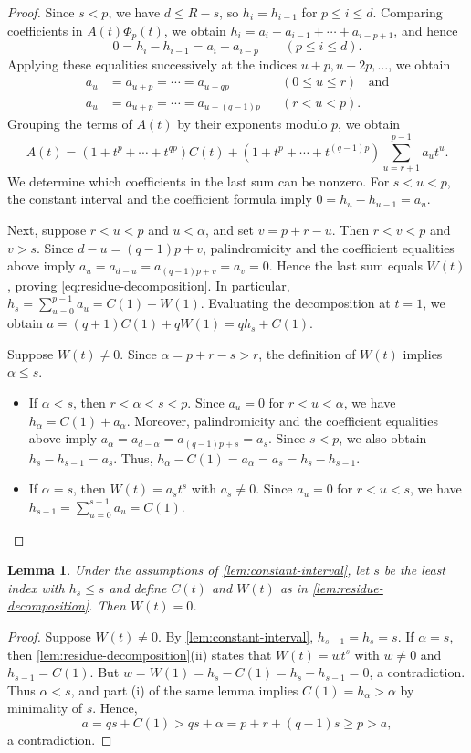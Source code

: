 \documentclass[11pt,a4paper]{amsart}
\newtheorem{lemma}[lemma]{Lemma}
\theoremstyle{definition}
\theoremstyle{remark}
\begin{document}
\begin{proof}
Since $s<p$, we have $d\le R-s$, so $h_i=h_{i-1}$ for $p\le i\le d$. Comparing coefficients in $A(t)\Phi_p(t)$, we obtain $h_i=a_i+a_{i-1}+\cdots+a_{i-p+1}$, and hence
\[0=h_i-h_{i-1}=a_i-a_{i-p}\qquad(p\le i\le d).\]
Applying these equalities successively at the indices $u+p,u+2p,\ldots$, we obtain
\begin{align*}
a_u&=a_{u+p}=\cdots=a_{u+qp}&&(0\le u\le r)\;\;\text{ and}\\
a_u&=a_{u+p}=\cdots=a_{u+(q-1)p}&&(r<u<p).
\end{align*}
Grouping the terms of $A(t)$ by their exponents modulo $p$, we obtain
\[A(t)=(1+t^p+\cdots+t^{qp})C(t)+(1+t^p+\cdots+t^{(q-1)p})\sum_{u=r+1}^{p-1}a_ut^u.\]
We determine which coefficients in the last sum can be nonzero. For $s<u<p$, the constant interval and the coefficient formula imply $0=h_u-h_{u-1}=a_u$.

Next, suppose $r<u<p$ and $u<\alpha$, and set $v=p+r-u$. Then $r<v<p$ and $v>s$. Since $d-u=(q-1)p+v$, palindromicity and the coefficient equalities above imply $a_u=a_{d-u}=a_{(q-1)p+v}=a_v=0$. Hence the last sum equals $W(t)$, proving \eqref{eq:residue-decomposition}. In particular, $h_s=\sum_{u=0}^{p-1}a_u=C(1)+W(1)$. Evaluating the decomposition at $t=1$, we obtain $a=(q+1)C(1)+qW(1)=qh_s+C(1)$.

Suppose $W(t)\ne0$. Since $\alpha=p+r-s>r$, the definition of $W(t)$ implies $\alpha\le s$.
\begin{itemize}
\item[\textup{(i)}] If $\alpha<s$, then $r<\alpha<s<p$. Since $a_u=0$ for $r<u<\alpha$, we have $h_\alpha=C(1)+a_\alpha$. Moreover, palindromicity and the coefficient equalities above imply $a_\alpha=a_{d-\alpha}=a_{(q-1)p+s}=a_s$. Since $s<p$, we also obtain $h_s-h_{s-1}=a_s$. Thus, $h_\alpha-C(1)=a_\alpha=a_s=h_s-h_{s-1}$.
\item[\textup{(ii)}] If $\alpha=s$, then $W(t)=a_st^s$ with $a_s\ne0$. Since $a_u=0$ for $r<u<s$, we have $h_{s-1}=\sum_{u=0}^{s-1}a_u=C(1)$.
\end{itemize}
\end{proof}

\begin{lemma}\label{lem:W-zero}
Under the assumptions of \cref{lem:constant-interval}, let $s$ be the least index with $h_s\le s$ and define $C(t)$ and $W(t)$ as in \cref{lem:residue-decomposition}. Then $W(t)=0$.
\end{lemma}
\begin{proof}
Suppose $W(t)\ne0$. By \cref{lem:constant-interval}, $h_{s-1}=h_s=s$. If $\alpha=s$, then \cref{lem:residue-decomposition}\textup{(ii)} states that $W(t)=wt^s$ with $w\ne0$ and $h_{s-1}=C(1)$. But $w=W(1)=h_s-C(1)=h_s-h_{s-1}=0$, a contradiction. Thus $\alpha<s$, and part \textup{(i)} of the same lemma implies $C(1)=h_\alpha>\alpha$ by minimality of $s$.
Hence, \[a=qs+C(1)>qs+\alpha=p+r+(q-1)s\ge p>a,\]
a contradiction.
\end{proof}
\end{document}
